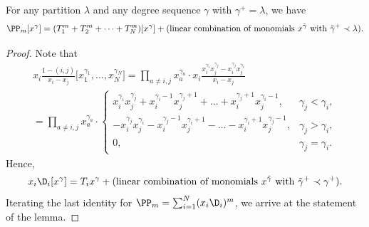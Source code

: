 \begin{lemma} \label{Lemma_triangularity}
 For any partition $\lambda$ and any degree sequence $\gamma$ with $\gamma^+=\lambda$, we have
{\small $$
 \PP_m[x^{\gamma}]=(T_1^m+T_2^m+\dots+T_N^m)[x^{\gamma}]+(\text{linear combination of monomials } x^{\tilde \gamma}\text{ with }\tilde \gamma^+\prec\lambda).
 $$}
\end{lemma}
\begin{proof}
 Note that
 \begin{multline}
   x_i \frac{1-(i,j)}{x_i-x_j} \bigl[x_1^{\gamma_1},\dots, x_N^{\gamma_N}\bigr]= \prod_{a\ne i,j} x_a^{\gamma_a} \cdot  x_i \frac{x_i^{\gamma_i} x_j^{\gamma_j}-x_i^{\gamma_j} x_j^{\gamma_i}}{x_i-x_j}\\
   = \prod_{a\ne i,j} x_a^{\gamma_a}\cdot \begin{cases} x_i^{\gamma_i} x_j^{\gamma_j}+ x_i^{\gamma_i-1} x_j^{\gamma_j+1}+\dots+ x_i^{\gamma_j+1} x_j^{\gamma_i-1},& \gamma_j<\gamma_i,\\
   -x_i^{\gamma_j} x_j^{\gamma_i}- x_i^{\gamma_j-1} x_j^{\gamma_i+1}-\dots- x_i^{\gamma_i+1} x_j^{\gamma_j-1},& \gamma_j>\gamma_i,\\
   0,& \gamma_j=\gamma_i. \end{cases}
 \end{multline}
Hence,
$$
 x_i \D_i [x^{\gamma}]= T_i x^{\gamma}+ (\text{linear combination of monomials } x^{\tilde \gamma}\text{ with }\tilde \gamma^+\prec\gamma^+).
$$
Iterating the last identity for $\PP_m=\sum_{i=1}^N (x_i \D_i)^m$, we arrive at the statement of the lemma.
\end{proof}

